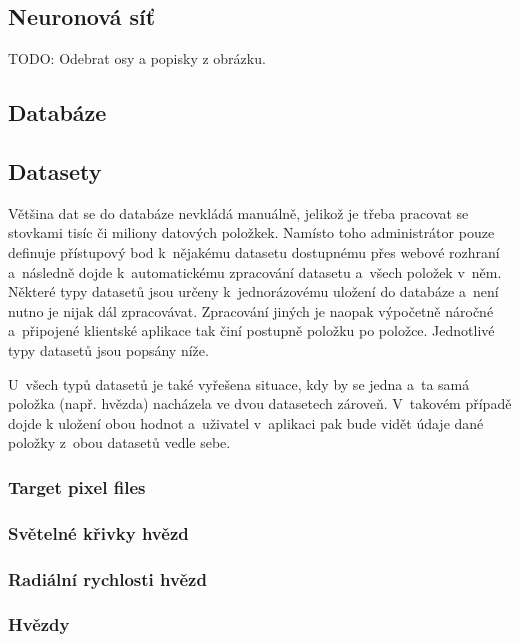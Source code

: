 \documentclass[a4paper,12pt]{article}
\begin{document}
{{{{{{\subsection{Neuronová síť}

TODO: Odebrat osy a popisky z obrázku.

\subsection{Databáze}

\subsection{Datasety}

Většina dat se do databáze nevkládá manuálně, jelikož je třeba pracovat se stovkami tisíc či miliony datových položkek. Namísto toho administrátor pouze definuje přístupový bod k~nějakému datasetu dostupnému přes webové rozhraní a~následně dojde k~automatickému zpracování datasetu a~všech položek v~něm. Některé typy datasetů jsou určeny k~jednorázovému uložení do databáze a~není nutno je nijak dál zpracovávat. Zpracování jiných je naopak výpočetně náročné a~připojené klientské aplikace tak činí postupně položku po položce. Jednotlivé typy datasetů jsou popsány níže.

U~všech typů datasetů je také vyřešena situace, kdy by se jedna a~ta samá položka (např. hvězda) nacházela ve dvou datasetech zároveň. V~takovém případě dojde k uložení obou hodnot a~uživatel v~aplikaci pak bude vidět údaje dané položky z~obou datasetů vedle sebe.

\subsubsection{Target pixel files}

\subsubsection{Světelné křivky hvězd}

\subsubsection{Radiální rychlosti hvězd}

\subsubsection{Hvězdy}

}}}}}}
\end{document}
